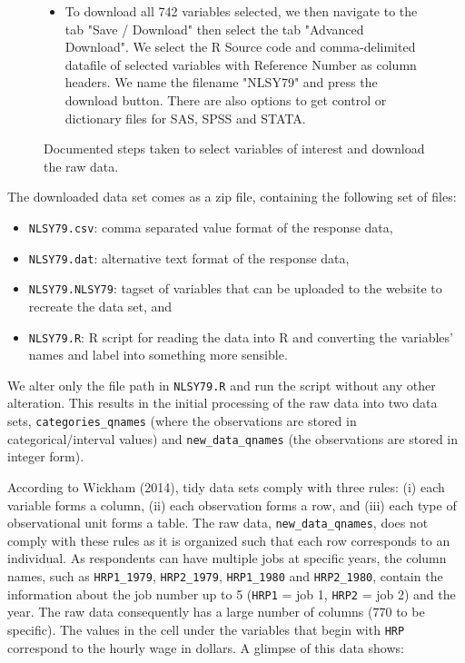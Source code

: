 \documentclass[12pt]{article}
\providecommand{\tightlist}{%
  \setlength{\itemsep}{0pt}\setlength{\parskip}{0pt}}
\begin{document}
\begin{figure}[t]
\begin{tcolorbox}[title = Navigating the data source]
\begin{itemize}
\begin{itemize}
\end{itemize}
\end{itemize}
\begin{itemize}
\item[\faCloudDownload] To download all 742 variables selected, we then navigate to the tab "Save / Download" then select the tab "Advanced Download". We select the R Source code and comma-delimited datafile of selected variables with Reference Number as column headers. We name the filename "NLSY79" and press the download button. There are also options to get control or dictionary files for SAS, SPSS and STATA.
\end{itemize}
\end{tcolorbox}
\caption{Documented steps taken to select variables of interest and download the raw data.\label{fig:source-nav}}
\end{figure}

The downloaded data set comes as a zip file, containing the following set of files:

\begin{itemize}
\tightlist
\item
  \texttt{NLSY79.csv}: comma separated value format of the response data,
\item
  \texttt{NLSY79.dat}: alternative text format of the response data,
\item
  \texttt{NLSY79.NLSY79}: tagset of variables that can be uploaded to the website to recreate the data set, and
\item
  \texttt{NLSY79.R}: R script for reading the data into R and converting the variables' names and label into something more sensible.
\end{itemize}

We alter only the file path in \texttt{NLSY79.R} and run the script without any other alteration. This results in the initial processing of the raw data into two data sets, \texttt{categories\_qnames} (where the observations are stored in categorical/interval values) and \texttt{new\_data\_qnames} (the observations are stored in integer form).

According to Wickham (2014), tidy data sets comply with three rules: (i) each variable forms a column, (ii) each observation forms a row, and (iii) each type of observational unit forms a table. The raw data, \texttt{new\_data\_qnames}, does not comply with these rules as it is organized such that each row corresponds to an individual. As respondents can have multiple jobs at specific years, the column names, such as \texttt{HRP1\_1979}, \texttt{HRP2\_1979}, \texttt{HRP1\_1980} and \texttt{HRP2\_1980}, contain the information about the job number up to 5 (\texttt{HRP1} = job 1, \texttt{HRP2} = job 2) and the year. The raw data consequently has a large number of columns (770 to be specific). The values in the cell under the variables that begin with \texttt{HRP} correspond to the hourly wage in dollars. A glimpse of this data shows:
\end{document}

